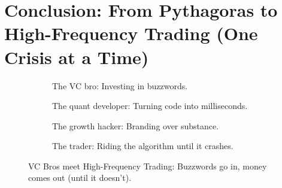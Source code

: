 \section{Conclusion: From Pythagoras to High-Frequency Trading (One Crisis at a Time)}


\begin{figure}[H]
  \centering
  
  \begin{subfigure}[t]{0.45\textwidth}
  \centering
  \caption*{The VC bro: Investing in buzzwords.}
  \end{subfigure}
  \hfill
  \begin{subfigure}[t]{0.45\textwidth}
  \centering
  \caption*{The quant developer: Turning code into milliseconds.}
  \end{subfigure}
  
  \vspace{1em}
  
  \begin{subfigure}[t]{0.45\textwidth}
  \centering
  \caption*{The growth hacker: Branding over substance.}
  \end{subfigure}
  \hfill
  \begin{subfigure}[t]{0.45\textwidth}
  \centering
  \caption*{The trader: Riding the algorithm until it crashes.}
  \end{subfigure}
  
  \caption{VC Bros meet High-Frequency Trading: Buzzwords go in, money comes out (until it doesn't).}
  \end{figure}
  


